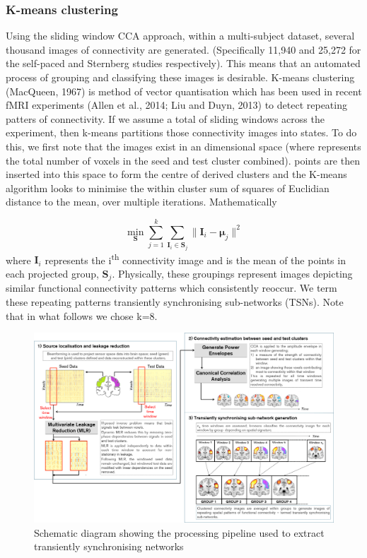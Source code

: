 \subsubsection{K-means clustering}
Using the sliding window CCA approach, within a multi-subject dataset, several thousand images of connectivity are generated. (Specifically 11,940 and 25,272 for the self-paced and Sternberg studies respectively). This means that an automated process of grouping and classifying these images is desirable. K-means clustering (MacQueen, 1967) is method of vector quantisation which has been used in recent fMRI experiments (Allen et al., 2014; Liu and Duyn, 2013) to detect repeating patters of connectivity. If we assume a total of   sliding windows across the experiment, then k-means partitions those   connectivity images into   states. To do this, we first note that the images exist in an   dimensional space (where   represents the total number of voxels in the seed and test cluster combined).   points are then inserted into this space to form the centre of derived clusters and the K-means algorithm looks to minimise the within cluster sum of squares of Euclidian distance to the mean, over multiple iterations. Mathematically

\begin{equation}
\min_\mathbf{S} \sum_{j=1}^{k} \sum_{\mathbf{I}_i \in \mathbf{S}_j}\parallel\mathbf{I}_i - \mathbf{\mu}_j\parallel^2
\end{equation} where $\mathbf{I}_i$  represents the i\textsuperscript{th} connectivity image and    is the mean of the points in each projected group,  $\mathbf{S}_j$. Physically, these groupings represent images depicting similar functional connectivity patterns which consistently reoccur. We term these repeating patterns transiently synchronising sub-networks (TSNs). Note that in what follows we chose  k=8.

\begin{landscape}
	\begin{figure}
		\begin{center}
			\includegraphics[width=0.9\linewidth]{./images/chapter5/Figure_1.png}
			\caption{Schematic diagram showing the processing pipeline used to extract transiently synchronising networks \label{figure_5_1}}
		\end{center}
	\end{figure}
\end{landscape}

